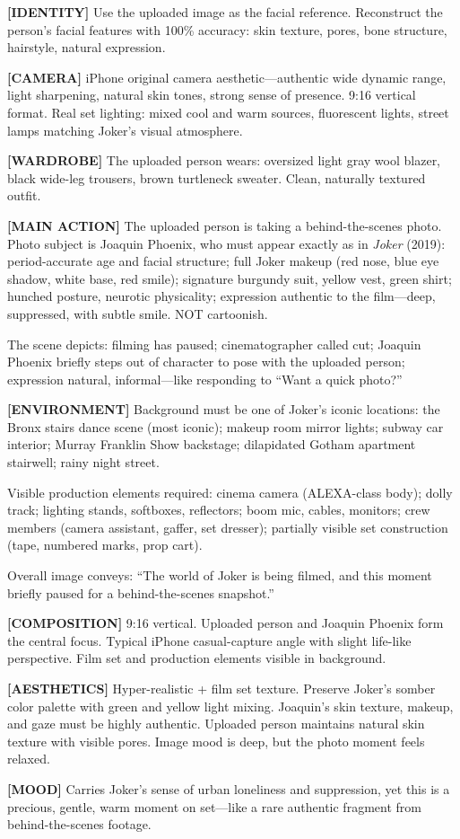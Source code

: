 \begin{Prompt}
\textbf{[IDENTITY]}
Use the uploaded image as the facial reference. Reconstruct the person's facial features with 100\% accuracy: skin texture, pores, bone structure, hairstyle, natural expression.

\textbf{[CAMERA]}
iPhone original camera aesthetic—authentic wide dynamic range, light sharpening, natural skin tones, strong sense of presence. 9:16 vertical format. Real set lighting: mixed cool and warm sources, fluorescent lights, street lamps matching Joker's visual atmosphere.

\textbf{[WARDROBE]}
The uploaded person wears: oversized light gray wool blazer, black wide-leg trousers, brown turtleneck sweater. Clean, naturally textured outfit.

\textbf{[MAIN ACTION]}
The uploaded person is taking a behind-the-scenes photo. Photo subject is Joaquin Phoenix, who must appear exactly as in \textit{Joker} (2019): period-accurate age and facial structure; full Joker makeup (red nose, blue eye shadow, white base, red smile); signature burgundy suit, yellow vest, green shirt; hunched posture, neurotic physicality; expression authentic to the film—deep, suppressed, with subtle smile. NOT cartoonish.

The scene depicts: filming has paused; cinematographer called cut; Joaquin Phoenix briefly steps out of character to pose with the uploaded person; expression natural, informal—like responding to ``Want a quick photo?''

\textbf{[ENVIRONMENT]}
Background must be one of Joker's iconic locations: the Bronx stairs dance scene (most iconic); makeup room mirror lights; subway car interior; Murray Franklin Show backstage; dilapidated Gotham apartment stairwell; rainy night street.

Visible production elements required: cinema camera (ALEXA-class body); dolly track; lighting stands, softboxes, reflectors; boom mic, cables, monitors; crew members (camera assistant, gaffer, set dresser); partially visible set construction (tape, numbered marks, prop cart).

Overall image conveys: ``The world of Joker is being filmed, and this moment briefly paused for a behind-the-scenes snapshot.''

\textbf{[COMPOSITION]}
9:16 vertical. Uploaded person and Joaquin Phoenix form the central focus. Typical iPhone casual-capture angle with slight life-like perspective. Film set and production elements visible in background.

\textbf{[AESTHETICS]}
Hyper-realistic + film set texture. Preserve Joker's somber color palette with green and yellow light mixing. Joaquin's skin texture, makeup, and gaze must be highly authentic. Uploaded person maintains natural skin texture with visible pores. Image mood is deep, but the photo moment feels relaxed.

\textbf{[MOOD]}
Carries Joker's sense of urban loneliness and suppression, yet this is a precious, gentle, warm moment on set—like a rare authentic fragment from behind-the-scenes footage.
\end{Prompt}

